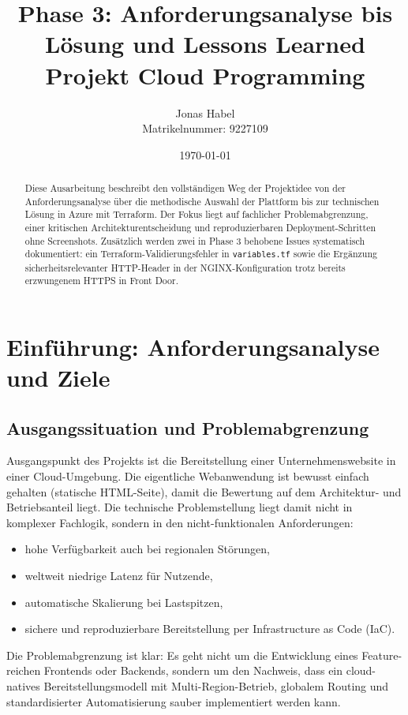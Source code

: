 \documentclass[a4paper,11pt]{article}
\title{Phase 3: Anforderungsanalyse bis Lösung und Lessons Learned\\Projekt Cloud Programming}
\author{Jonas Habel\\Matrikelnummer: 9227109}
\date{\today}
\begin{document}
\maketitle

\begin{abstract}
Diese Ausarbeitung beschreibt den vollständigen Weg der Projektidee von der Anforderungsanalyse über die methodische Auswahl der Plattform bis zur technischen Lösung in Azure mit Terraform. Der Fokus liegt auf fachlicher Problemabgrenzung, einer kritischen Architekturentscheidung und reproduzierbaren Deployment-Schritten ohne Screenshots. Zusätzlich werden zwei in Phase 3 behobene Issues systematisch dokumentiert: ein Terraform-Validierungsfehler in \texttt{variables.tf} sowie die Ergänzung sicherheitsrelevanter HTTP-Header in der NGINX-Konfiguration trotz bereits erzwungenem HTTPS in Front Door.
\end{abstract}

\section{Einführung: Anforderungsanalyse und Ziele}
\subsection{Ausgangssituation und Problemabgrenzung}
Ausgangspunkt des Projekts ist die Bereitstellung einer Unternehmenswebsite in einer Cloud-Um\-ge\-bung. Die eigentliche Webanwendung ist bewusst einfach gehalten (statische HTML-Seite), damit die Bewertung auf dem Architektur- und Betriebsanteil liegt. Die technische Problemstellung liegt damit nicht in komplexer Fachlogik, sondern in den nicht-funktionalen Anforderungen:

\begin{itemize}
  \item hohe Verfügbarkeit auch bei regionalen Störungen,
  \item weltweit niedrige Latenz für Nutzende,
  \item automatische Skalierung bei Lastspitzen,
  \item sichere und reproduzierbare Bereitstellung per Infrastructure as Code (IaC).
\end{itemize}

Die Problemabgrenzung ist klar: Es geht nicht um die Entwicklung eines Feature-reichen Frontends oder Backends, sondern um den Nachweis, dass ein cloud-natives Bereitstellungsmodell mit Multi-Region-Betrieb, globalem Routing und standardisierter Automatisierung sauber implementiert werden kann.
\end{document}
